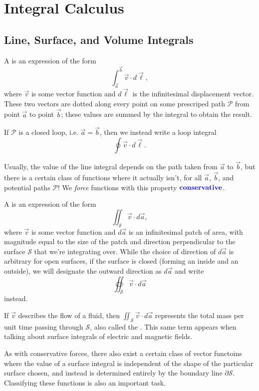 \section{Integral Calculus}

\subsection{Line, Surface, and Volume Integrals}

\begin{definition}
    A  is an expression of the form 
    \[\int_{\vec{a}}^{\vec{b}}\vec{v}\cdot d\vec{\ell},\]
    where $\vec{v}$ is some vector function and $d\vec{\ell}$ is the infinitesimal displacement vector.
    These two vectors are dotted along every point on some prescriped path $\mathcal{P}$ from point $\vec{a}$ to point $\vec{b}$;
    these values are summed by the integral to obtain the result.

    If $\mathcal{P}$ is a closed loop, i.e. $\vec{a}=\vec{b}$, then we instead write a loop integral
    \[\oint\vec{v}\cdot d\vec{\ell}.\]
\end{definition}

Usually, the value of the line integral depends on the path taken from $\vec{a}$ to $\vec{b}$,
but there is a certain class of functions where it actually isn't, for all $\vec{a}$, $\vec{b}$, and potential paths $\mathcal{P}$!
We \textit{force} functions with this property $\textbf{\color{blue} conservative}$.

\begin{definition}
    A  is an expression of the form
    \[\iint_{\mathcal{S}}\vec{v}\cdot d\vec{a},\]
    where $\vec{v}$ is some vector function and $d\vec{a}$ is an infinitesimal patch of area, 
    with magnitude equal to the size of the patch and direction perpendicular to the surface $\mathcal{S}$
    that we're integrating over. While the choice of direction of $d\vec{a}$ is arbitrary for open surfaces,
    if the surface is closed (forming an inside and an outside), we will designate the outward direction as $d\vec{a}$
    and write
    \[\oiint_{\mathcal{S}}\vec{v}\cdot d\vec{a}\]
    instead.
\end{definition}

If $\vec{v}$ describes the flow of a fluid, then $\iint_\mathcal{S}\vec{v}\cdot d\vec{a}$ represents the total mass per unit time 
passing through $\mathcal{S}$, also called the . This same term appears when talking about surface integrals of electric and magnetic fields.

As with conservative forces, there also exist a certain class of vector functoins where
the value of a surface integral is independent of the shape of the particular surface chosen,
and instead is determined entirely by the boundary line $\partial \mathcal{S}$. 
Classifying these functions is also an important task.

